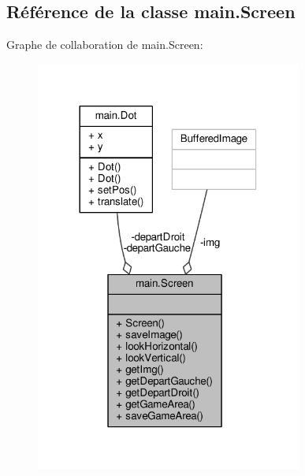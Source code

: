 \hypertarget{classmain_1_1Screen}{}\subsection{Référence de la classe main.\+Screen}
\label{classmain_1_1Screen}


Graphe de collaboration de main.\+Screen\+:\nopagebreak
\begin{figure}[H]
\begin{center}
\leavevmode
\includegraphics[width=248pt]{classmain_1_1Screen__coll__graph}
\end{center}
\end{figure}
